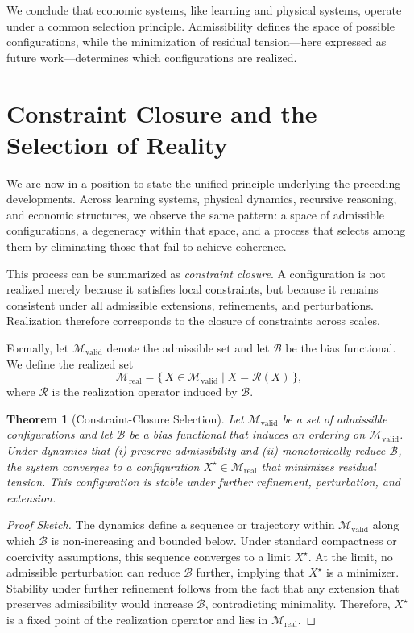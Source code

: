 \documentclass[11pt]{article}
\theoremstyle{plain}
\newtheorem{theorem}{Theorem}[section]
\theoremstyle{definition}
\theoremstyle{remark}
\begin{document}
We conclude that economic systems, like learning and physical systems, operate under a common selection principle. Admissibility defines the space of possible configurations, while the minimization of residual tension---here expressed as future work---determines which configurations are realized.

\section{Constraint Closure and the Selection of Reality}

We are now in a position to state the unified principle underlying the preceding developments. Across learning systems, physical dynamics, recursive reasoning, and economic structures, we observe the same pattern: a space of admissible configurations, a degeneracy within that space, and a process that selects among them by eliminating those that fail to achieve coherence.

This process can be summarized as \emph{constraint closure}. A configuration is not realized merely because it satisfies local constraints, but because it remains consistent under all admissible extensions, refinements, and perturbations. Realization therefore corresponds to the closure of constraints across scales.

Formally, let $\mathcal{M}_{\mathrm{valid}}$ denote the admissible set and let $\mathcal{B}$ be the bias functional. We define the realized set
\[
\mathcal{M}_{\mathrm{real}} = \{\, X \in \mathcal{M}_{\mathrm{valid}} \mid X = \mathcal{R}(X) \,\},
\]
where $\mathcal{R}$ is the realization operator induced by $\mathcal{B}$.

\begin{theorem}[Constraint-Closure Selection]
Let $\mathcal{M}_{\mathrm{valid}}$ be a set of admissible configurations and let $\mathcal{B}$ be a bias functional that induces an ordering on $\mathcal{M}_{\mathrm{valid}}$. Under dynamics that (i) preserve admissibility and (ii) monotonically reduce $\mathcal{B}$, the system converges to a configuration $X^\star \in \mathcal{M}_{\mathrm{real}}$ that minimizes residual tension. This configuration is stable under further refinement, perturbation, and extension.
\end{theorem}

\begin{proof}[Proof Sketch]
The dynamics define a sequence or trajectory within $\mathcal{M}_{\mathrm{valid}}$ along which $\mathcal{B}$ is non-increasing and bounded below. Under standard compactness or coercivity assumptions, this sequence converges to a limit $X^\star$. At the limit, no admissible perturbation can reduce $\mathcal{B}$ further, implying that $X^\star$ is a minimizer. Stability under further refinement follows from the fact that any extension that preserves admissibility would increase $\mathcal{B}$, contradicting minimality. Therefore, $X^\star$ is a fixed point of the realization operator and lies in $\mathcal{M}_{\mathrm{real}}$.
\end{proof}
\end{document}
